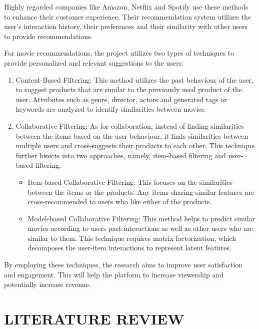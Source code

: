 \documentclass[a4paper,10pt]{article}
\begin{document}
Highly regarded companies like Amazon, Netflix and Spotify use these methods to enhance their customer experience. Their recommendation system utilizes the user's interaction history, their preferences and their similarity with other users to provide recommendations.

For movie recommendations, the project utilizes two types of techniques to provide personalized and relevant suggestions to the users:

\begin{enumerate}
    \item Content-Based Filtering: This method utilizes the past behaviour of the user, to suggest products that are similar to the previously used product of the user. Attributes such as genre, director, actors and generated tags or keywords are analyzed to identify similarities between movies.

    \item Collaborative Filtering: As for collaboration, instead of finding similarities between the items based on the user behaviour, it finds similarities between multiple users and cross-suggests their products to each other. This technique further bisects into two approaches, namely, item-based filtering and user-based filtering.
    \begin{itemize}
        \item Item-based Collaborative Filtering: This focuses on the similarities between the items or the products. Any items sharing similar features are cross-recommended to users who like either of the products.

        \item Model-based Collaborative Filtering:
        This method helps to predict similar movies according to users past interactions as well as other users who are similar to them. This technique requires matrix factorization, which decomposes the user-item interactions to represent latent features.

    \end{itemize}
    
\end{enumerate}

By employing these techniques, the research aims to improve user satisfaction and engagement. This will help the platform to increase viewership and potentially increase revenue.

\section{LITERATURE REVIEW}
\end{document}
